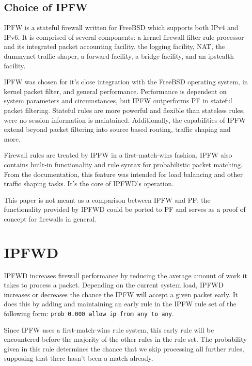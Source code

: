 \documentclass[journal]{IEEEtran}
\begin{document}
\subsection{Choice of IPFW}
IPFW is a stateful firewall written for FreeBSD which supports both IPv4 and
IPv6. It is comprised of several components: a kernel firewall filter rule
processor and its integrated packet accounting facility, the logging facility,
NAT, the dummynet traffic shaper, a forward facility, a bridge facility, and
an ipstealth facility.

IPFW was chosen for it's close integration with the FreeBSD operating system,
in kernel packet filter, and general performance. Performance is dependent on
system parameters and circumstances, but IPFW outperforms PF in stateful packet
filtering. Stateful rules are more powerful and flexible than stateless rules,
were no session information is maintained. Additionally, the capabilities of
IPFW extend beyond packet filtering into source based routing, traffic shaping
and more. 

Firewall rules are treated by IPFW in a first-match-wins fashion. IPFW also
contains built-in functionality and rule syntax for probabilistic packet
matching. From the documentation, this feature was intended for load balancing
and other traffic shaping tasks. It's the core of IPFWD's operation. 

This paper is not meant as a comparison between IPFW and PF; the functionality
provided by IPFWD could be ported to PF and serves as a proof of concept for
firewalls in general.


\section{IPFWD}

IPFWD increases firewall performance by reducing the average amount of work it
takes to process a packet. Depending on the current system load, IPFWD
increases or decreases the chance the IPFW will accept a given
packet early. It does this by adding and maintaining an early rule in the IPFW rule
set of the following form: \verb|prob 0.000 allow ip from any to any|. 

Since IPFW uses a first-match-wins rule system, this early rule will be
encountered before the majority of the other rules in the rule set.  The
probability given in this rule determines the chance that we skip processing
all further rules, supposing that there hasn't been a match already.  
\end{document}
